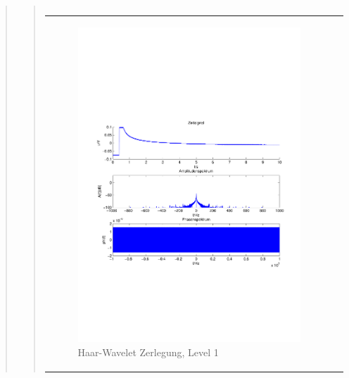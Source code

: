 \begin{quote}
\begin{quote}
\begin{center}
\begin{tabular}{ll}
                \end{tabular}
                \end{center}
                
                
                
                        \begin{center}
                \begin{tabular}{ll}
    
                \hspace{-8em}
                    \begin{minipage}{0.6\textwidth}
    
                        \begin{figure}[H]
                            \label{fig:}
                            \includegraphics[scale=0.4, trim = 2cm 6cm 1cm
                            7.5cm,
                            clip]{./Bilder/Termin8/fehlerfrei_hochlaufen_Spektrum.pdf}
                            \caption{Haar-Wavelet Zerlegung, Level 1}
                        \end{figure}
    

\end{minipage}
\end{tabular}
\end{center}
\end{quote}
\end{quote}
